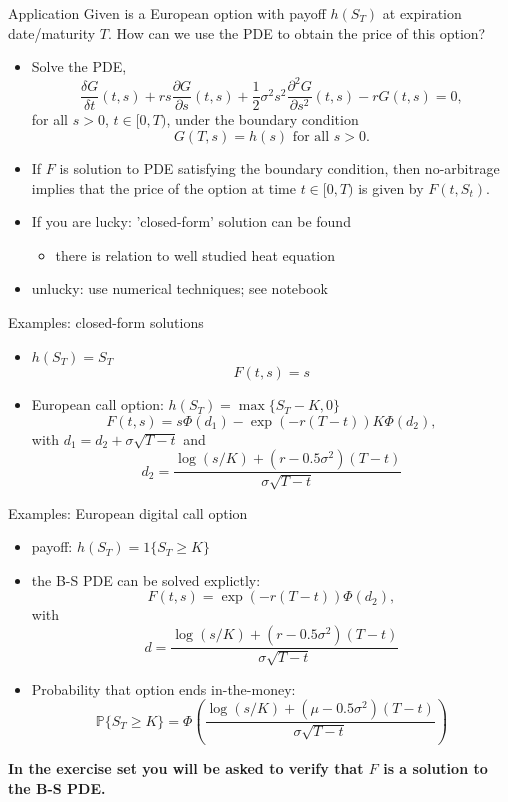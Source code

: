 \documentclass[pdf, handout]{beamer}
\begin{document}
\begin{frame}{Application}
Given is a European option with payoff $h(S_T)$ at expiration date/maturity $T$. How can we use the PDE to obtain the price of this option? 
\begin{itemize}
\item Solve the  PDE,
\[
\frac{\delta G}{\delta t}(t, s) + r s \frac{\partial G}{\partial
s}(t, s) + \frac{1}{2}\sigma^2 s^2 \frac{\partial^2 G}{\partial
s^2}(t,s) -r G(t,s )=0,
\]
for all $s>0$, $t\in[0,T)$,
under the boundary condition
\[
G(T,s)=h(s) \text{ for all } s>0.
\]
\item If $F$ is solution to PDE satisfying the boundary condition, then no-arbitrage implies that the price of the option at time $t\in [0, T)$ is given by $F(t, S_t)$.
\item If you are lucky: 'closed-form' solution can be found
\begin{itemize}
\item there is relation to well studied  heat equation
\end{itemize}
\item unlucky:
use numerical techniques; see notebook
\end{itemize}
\end{frame}
%
\begin{frame}{Examples: closed-form solutions}
\begin{itemize}
\item $h(S_T)=S_T$
\[
F(t,s)=s
\]
\item European call option: $h(S_T)=\max\{ S_T-K,0\}$
\[
F(t,s)=s\Phi(d_1)-\exp(-r(T-t))K\Phi(d_2),
\]
with
$d_1=d_2+\sigma\sqrt{T-t}$ and
\[
d_2=\frac{
\log(s/K)+(r-0.5 \sigma^2)(T-t)}{\sigma\sqrt{T-t}}
\]
\end{itemize}
\end{frame}
%
\begin{frame}{Examples: European digital call option}
\begin{itemize}
\item payoff: $h(S_T)=1\{S_T\geq K\}$
\item the B-S PDE can be solved explictly:
\[
F(t,s)=\exp(-r(T-t))\Phi(d_2),
\]
with
\[
d=\frac{
\log(s/K)+(r-0.5 \sigma^2)(T-t)}{\sigma\sqrt{T-t}}
\]
\item
Probability that option ends in-the-money:
\[
\mathbb{P}\{S_T\geq K\}=\Phi\left(
\frac{
\log(s/K)+(\mu-0.5 \sigma^2)(T-t)}{\sigma\sqrt{T-t}}\right)
\]
\end{itemize}
\textbf{In the exercise set you will be asked to verify that $F$ is a solution to the B-S PDE.}
\end{frame}
\end{document}
